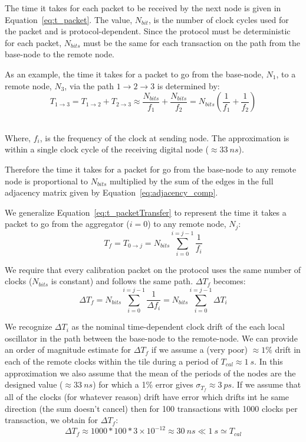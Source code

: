 The time it takes for each packet to be received by the next node is given in Equation~\ref{eq:t_packet}.
The value, $N_{bit}$, is the number of clock cycles used for the packet and is protocol-dependent.
Since the protocol must be deterministic for each packet, $N_{bits}$ must be the same for each transaction on the path from the base-node to the remote node.

As an example, the time it takes for a packet to go from the base-node, $N_{1}$, to a remote node, $N_{3}$, via the path $1\rightarrow 2 \rightarrow 3$ is determined by:
\begin{equation}
  T_{1\rightarrow 3} = T_{1\rightarrow 2} + T_{2\rightarrow 3} \approx \frac{N_{bits}}{f_{1}} + \frac{N_{bits}}{f_{2}} = N_{bits}(\frac{1}{f_{1}} + \frac{1}{f_{2}})
\end{equation}~\label{eq:t_packetTransfer}

Where, $f_{i}$, is the frequency of the clock at sending node. The approximation is within a single clock cycle of the receiving digital node ($\approx 33~\unit{ns}$).

Therefore the time it takes for a packet for go from the base-node to any remote node is proportional to $N_{bits}$ multiplied by the sum of the edges in the full adjacency matrix given by Equation~\ref{eq:adjacency_comp}.

We generalize Equation~\ref{eq:t_packetTransfer} to represent the time it takes a packet to go from the aggregator ($i = 0$) to any remote node, $N_{j}$:
\begin{equation}
  T_{f} = T_{0\rightarrow j} = N_{bits}\sum_{i=0}^{i=j-1}\frac{1}{f_{i}}
\end{equation}

We require that every calibration packet on the protocol uses the same number of clocks ($N_{bits}$ is constant) and follows the same path. $\Delta T_{f}$ becomes:
\begin{equation}
  \Delta T_{f} = N_{bits}\sum_{i=0}^{i=j-1}\frac{1}{\Delta f_{i}} = N_{bits} \sum_{i=0}^{i=j-1}\Delta T_{i}
\end{equation}

We recognize $\Delta T_{i}$ as the nominal time-dependent clock drift of the each local oscillator in the path between the base-node to the remote-node.
We can provide an order of magnitude estimate for $\Delta T_{f}$ if we assume a (very poor) $\approx 1\%$ drift in each of the remote clocks within the tile during a period of $T_{cal} \approx 1~\unit{s}$.
In this approximation we also assume that the mean of the periods of the nodes are the designed value ($\approx 33~\unit{ns}$) for which a 1\% error gives $\sigma_{T_{f}} \approx 3~\unit{ps}$.
If we assume that all of the clocks (for whatever reason) drift have error which drifts int he same direction (the sum doesn't cancel) then for 100 transactions with 1000 clocks per transaction, we obtain for $\Delta T_{f}$:
\begin{equation}
  \Delta T_{f} \approx 1000 * 100 * 3\times 10^{-12} \approx 30~\unit{ns} \ll 1~\unit{s} \simeq T_{cal}
\end{equation}
